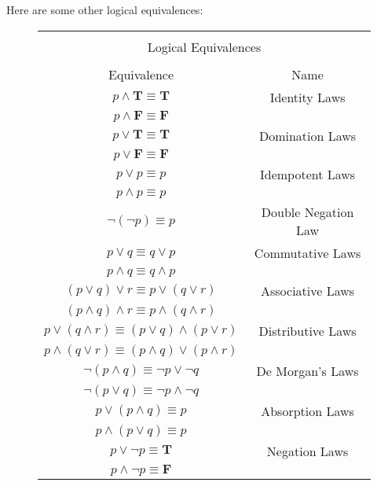\documentclass[article, 11pt]{article}
\theoremstyle{definition}
\newcommand{\true}{\textbf{T}} %
\newcommand{\false}{\textbf{F}} %
\begin{document}
    Here are some other logical equivalences:
    \begin{figure}[H]
        \centering
        {\setlength{\tabcolsep}{2em}
        \begin{tabular}{|c|c|}
            \hline
            \multicolumn{2}{|c|}{} \\
            \multicolumn{2}{|c|}{Logical Equivalences} \\
            \multicolumn{2}{|c|}{} \\
            \hline
            Equivalence & Name \\
            \hline
            $p \land \true \equiv \true$ & Identity Laws \\
            $p \land \false \equiv \false$ &  \\
            \hline
            $p \lor \true \equiv \true$ & Domination Laws \\
            $p \lor \false \equiv \false$ &  \\
            \hline
            $p \lor p \equiv p$ & Idempotent Laws \\
            $p \land p \equiv p$ &  \\
            \hline
            $\neg(\neg p) \equiv p$ & Double Negation Law \\
            \hline
            $p \lor q \equiv q \lor p $ & Commutative Laws \\
            $p \land q \equiv q \land p$ &  \\
            \hline
            $(p \lor q) \lor r \equiv p \lor (q \lor r)$ & Associative Laws \\
            $(p \land q) \land r \equiv p \land (q \land r)$ &  \\
            \hline
            $p \lor (q \land r) \equiv (p \lor q) \land (p \lor r)$ & Distributive Laws \\
            $p \land (q \lor r) \equiv (p \land q) \lor (p \land r)$ &  \\
            \hline
            $\neg(p \land q) \equiv \neg p \lor \neg q$ & De Morgan's Laws \\
            $\neg(p \lor q) \equiv \neg p \land \neg q$ &  \\
            \hline
            $p \lor (p \land q) \equiv p$ & Absorption Laws \\
            $p \land (p \lor q) \equiv p$ &  \\
            \hline
            $p \lor \neg p \equiv \true$ & Negation Laws \\
            $p \land \neg p \equiv \false$ &  \\
            \hline
        \end{tabular}}
    \end{figure}
    
\end{document}

